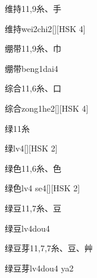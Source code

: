 \begin{entry}{维持}{11,9}{⽷、⼿}
  \begin{phonetics}{维持}{wei2chi2}[][HSK 4]
  \end{phonetics}
\end{entry}

\begin{entry}{绷带}{11,9}{⽷、⼱}
  \begin{phonetics}{绷带}{beng1dai4}
  \end{phonetics}
\end{entry}

\begin{entry}{综合}{11,6}{⽷、⼝}
  \begin{phonetics}{综合}{zong1he2}[][HSK 4]
  \end{phonetics}
\end{entry}

\begin{entry}{绿}{11}{⽷}
  \begin{phonetics}{绿}{lv4}[][HSK 2]
  \end{phonetics}
\end{entry}

\begin{entry}{绿色}{11,6}{⽷、⾊}
  \begin{phonetics}{绿色}{lv4 se4}[][HSK 2]
  \end{phonetics}
\end{entry}

\begin{entry}{绿豆}{11,7}{⽷、⾖}
  \begin{phonetics}{绿豆}{lv4dou4}
  \end{phonetics}
\end{entry}

\begin{entry}{绿豆芽}{11,7,7}{⽷、⾖、⾋}
  \begin{phonetics}{绿豆芽}{lv4dou4 ya2}
  \end{phonetics}
\end{entry}

